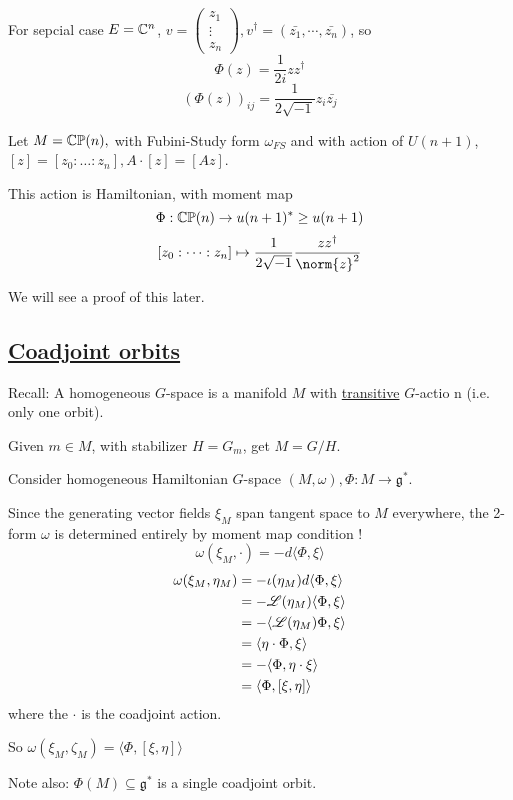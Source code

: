 \documentclass[x11names,reqno,14pt]{extarticle}
\newcommand{\mk}[1]{\mathfrak{#1}}
\newcommand{\g}{\mk{g}}
\begin{document}
For sepcial case $E = \mathbb{C}^n$, $v =\begin{pmatrix} z_1 \\ \vdots \\ z_n \end{pmatrix}, v^\dagger = (\bar{z_1},\cdots,\bar{z_n})$, so 
\[
\Phi(z) = \frac{1}{2i}zz^\dagger
\]
\[
(\Phi(z))_{ij} = \frac{1}{2\sqrt{-1}}z_i\bar{z_j}
\]

\exm

Let $M = {\mathbb{CP}}(n),$ with Fubini-Study form $\omega_{FS}$ and with action of $U(n+1)$, $[z] = [z_0:\dots:z_n], A\cdot[z] = [Az]$.

This action is Hamiltonian, with moment map 
\[
\Phi:{\mathbb{CP}}(n)\to u(n+1)^* \geq u(n + 1)
\]
\[
[z_0:\dots:z_n] \mapsto \frac{1}{2\sqrt{-1}}\frac{zz^\dagger}{\norm{z}^2}
\]

We will see a proof of this later. 

\subsection*{\underline{Coadjoint orbits}}

Recall: A homogeneous $G$-space is a manifold $M$ with \underline{transitive} $G$-actio n (i.e. only one orbit). 

Given $m\in M$, with stabilizer $H = G_m$, get $M = G/H$.

Consider homogeneous Hamiltonian $G$-space $(M,\omega),\Phi:M\to\g^*$. 

Since the generating vector fields $\xi_M$ span tangent space to $M$ everywhere, the 2-form $\omega$ is determined entirely by moment map condition !
\[
\omega(\xi_M,\cdot) = -d\langle\Phi,\xi\rangle
\]
\begin{align*}
\omega(\xi_M,\eta_M) & = -\iota(\eta_M)d\langle\Phi,\xi\rangle \\
& = -\mathscr{L}(\eta_M)\langle\Phi,\xi\rangle \\
& = -\langle\mathscr{L}(\eta_M)\Phi,\xi\rangle \\
& = \langle\eta\cdot\Phi,\xi\rangle \\
& = -\langle\Phi,\eta\cdot\xi\rangle \\
& = \langle\Phi,[\xi,\eta]\rangle
\end{align*}
where the $\cdot$ is the coadjoint action. 

So $\omega(\xi_M,\zeta_M) = \langle\Phi,[\xi,\eta]\rangle$

Note also: $\Phi(M)\subseteq\g^*$ is a single coadjoint orbit. 
\end{document}
